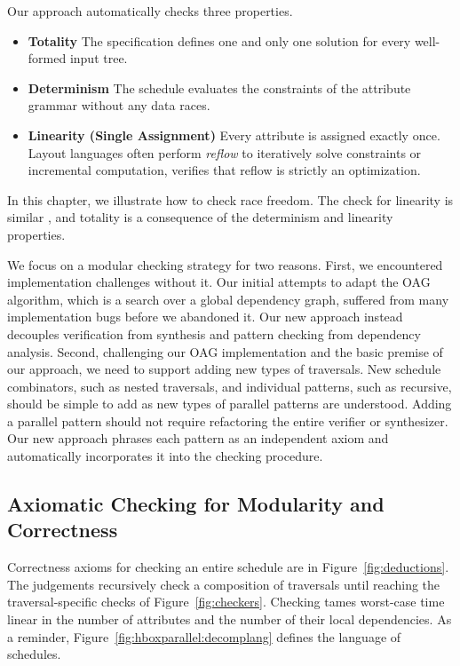 Our approach automatically checks three properties. 
\begin{itemize}
\item \textbf{Totality} The specification defines one and only one solution for every well-formed input tree. 
\item \textbf{Determinism} The schedule evaluates the constraints of the attribute grammar without any data races.
\item \textbf{Linearity (Single Assignment)} Every attribute is assigned exactly once. Layout languages often perform \emph{reflow} to iteratively solve constraints or incremental computation, verifies that reflow is strictly an optimization.
\end{itemize}
In this chapter, we illustrate how to check race freedom. The check for linearity is similar , and totality is a consequence of the determinism and linearity properties.

We focus on a modular checking strategy for two reasons. First, we encountered implementation challenges without it. Our initial attempts to adapt the OAG~\cite{oag} algorithm, which is a search over a global dependency graph, suffered from many implementation bugs before we abandoned it. Our new approach instead decouples verification from synthesis and pattern checking from dependency analysis. Second, challenging our OAG implementation and the basic premise of our approach, we need to support adding new types of traversals. New schedule combinators, such as nested traversals, and individual patterns, such as recursive, should be simple to add as new types of parallel patterns are understood. Adding a parallel pattern should not require refactoring the entire verifier or synthesizer. Our new approach phrases each pattern as an independent axiom and automatically incorporates it into the checking procedure.




\subsection{Axiomatic Checking for Modularity and Correctness}


Correctness axioms for checking an entire schedule are in Figure~\ref{fig:deductions}. The judgements recursively check a composition of traversals until reaching the traversal-specific checks of Figure~\ref{fig:checkers}. Checking tames worst-case time linear in the number of attributes and the number of their local dependencies. As a reminder, Figure~\ref{fig:hboxparallel:decomplang} defines the language of schedules.

